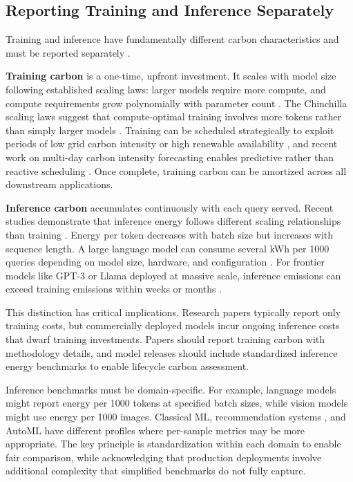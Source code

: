 \documentclass{article}
\theoremstyle{plain}
\theoremstyle{definition}
\theoremstyle{remark}
\begin{document}
\subsection{Reporting Training and Inference Separately}

Training and inference have fundamentally different carbon characteristics and must be reported separately \cite{luccioni2024power,samsi2023words,wu2022sustainable,jegham2025hungry}.

\textbf{Training carbon} is a one-time, upfront investment. It scales with model size following established scaling laws: larger models require more compute, and compute requirements grow polynomially with parameter count \cite{kaplan2020scaling,hoffmann2022training}. The Chinchilla scaling laws suggest that compute-optimal training involves more tokens rather than simply larger models \cite{hoffmann2022training}. Training can be scheduled strategically to exploit periods of low grid carbon intensity or high renewable availability \cite{dodge2022measuring}, and recent work on multi-day carbon intensity forecasting enables predictive rather than reactive scheduling \cite{maji2023forecasting}. Once complete, training carbon can be amortized across all downstream applications.

\textbf{Inference carbon} accumulates continuously with each query served. Recent studies demonstrate that inference energy follows different scaling relationships than training \cite{desislavov2023trends,samsi2023words,fernandez2025energy}. Energy per token decreases with batch size but increases with sequence length. A large language model can consume several kWh per 1000 queries depending on model size, hardware, and configuration \cite{luccioni2024power}. For frontier models like GPT-3 \cite{brown2020language} or Llama \cite{touvron2023llama2} deployed at massive scale, inference emissions can exceed training emissions within weeks or months \cite{chien2024reducing}.

This distinction has critical implications. Research papers typically report only training costs, but commercially deployed models incur ongoing inference costs that dwarf training investments. Papers should report training carbon with methodology details, and model releases should include standardized inference energy benchmarks to enable lifecycle carbon assessment.

Inference benchmarks must be domain-specific. For example, language models might report energy per 1000 tokens at specified batch sizes, while vision models might use energy per 1000 images. Classical ML, recommendation systems \cite{wegmeth2025green}, and AutoML have different profiles where per-sample metrics may be more appropriate. The key principle is standardization within each domain to enable fair comparison, while acknowledging that production deployments involve additional complexity that simplified benchmarks do not fully capture.
\end{document}
